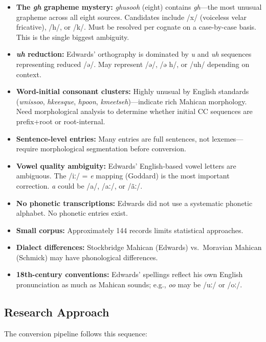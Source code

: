 \begin{itemize}
  \item \textbf{The \textit{gh} grapheme mystery:} \textit{ghusooh} (eight)
    contains \textit{gh}---the most unusual grapheme across all eight sources.
    Candidates include /x/ (voiceless velar fricative), /h/, or /k/. Must be
    resolved per cognate on a case-by-case basis. This is the single biggest
    ambiguity.
  \item \textbf{\textit{uh} reduction:} Edwards' orthography is dominated by
    \textit{u} and \textit{uh} sequences representing reduced /ə/. May
    represent /ə/, /ə h/, or /uh/ depending on context.
  \item \textbf{Word-initial consonant clusters:} Highly unusual by English
    standards (\textit{wnissoo}, \textit{hkeesque}, \textit{hpoon},
    \textit{kmeetseh})---indicate rich Mahican morphology. Need morphological
    analysis to determine whether initial CC sequences are prefix+root or
    root-internal.
  \item \textbf{Sentence-level entries:} Many entries are full sentences, not
    lexemes---require morphological segmentation before conversion.
  \item \textbf{Vowel quality ambiguity:} Edwards' English-based vowel letters
    are ambiguous. The /iː/ = \textit{e} mapping (Goddard) is the most
    important correction. \textit{a} could be /a/, /aː/, or /ãː/.
  \item \textbf{No phonetic transcriptions:} Edwards did not use a systematic
    phonetic alphabet. No phonetic entries exist.
  \item \textbf{Small corpus:} Approximately 144 records limits statistical
    approaches.
  \item \textbf{Dialect differences:} Stockbridge Mahican (Edwards) vs.\
    Moravian Mahican (Schmick) may have phonological differences.
  \item \textbf{18th-century conventions:} Edwards' spellings reflect his own
    English pronunciation as much as Mahican sounds; e.g., \textit{oo} may be
    /uː/ or /oː/.
\end{itemize}

\subsection{Research Approach}

The conversion pipeline follows this sequence:

